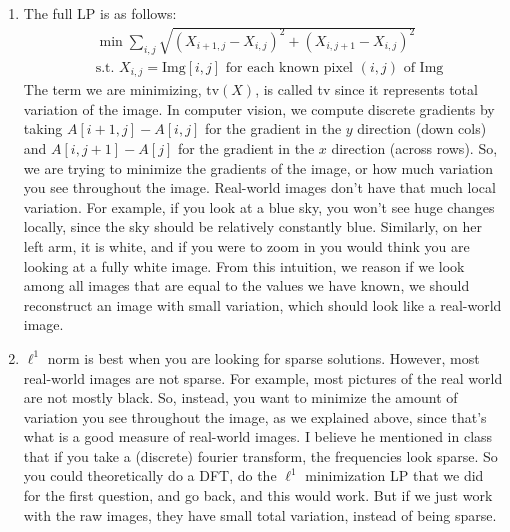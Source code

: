 \documentclass[12pt]{article}
\begin{document}
\begin{enumerate}[label=(\alph*)]
        \item The full LP is as follows:
        \begin{align*}
        &\min \sum_{i,j} \sqrt{(X_{i+1,j}-X_{i,j})^2 + (X_{i,j+1}-X_{i,j})^2} \\
        &\text{s.t. } X_{i,j} = \mathrm{Img}[i,j] \text{ for each known pixel $(i,j)$ of Img}
        \end{align*}
        The term we are minimizing, $\mathrm{tv}(X)$, is called tv since it represents total variation of the image. In computer vision, we compute discrete gradients by taking $A[i+1,j] - A[i,j]$ for the gradient in the $y$ direction (down cols) and $A[i,j+1] - A[j]$ for the gradient in the $x$ direction (across rows). So, we are trying to minimize the gradients of the image, or how much variation you see throughout the image. Real-world images don't have that much local variation. For example, if you look at a blue sky, you won't see huge changes locally, since the sky should be relatively constantly blue. Similarly, on her left arm, it is white, and if you were to zoom in you would think you are looking at a fully white image. From this intuition, we reason if we look among all images that are equal to the values we have known, we should reconstruct an image with small variation, which should look like a real-world image.

        \item $\ell^1$ norm is best when you are looking for sparse solutions. However, most real-world images are not sparse. For example, most pictures of the real world are not mostly black. So, instead, you want to minimize the amount of variation you see throughout the image, as we explained above, since that's what is a good measure of real-world images. I believe he mentioned in class that if you take a (discrete) fourier transform, the frequencies look sparse. So you could theoretically do a DFT, do the $\ell^1$ minimization LP that we did for the first question, and go back, and this would work. But if we just work with the raw images, they have small total variation, instead of being sparse.
    \end{enumerate}
\end{document}
